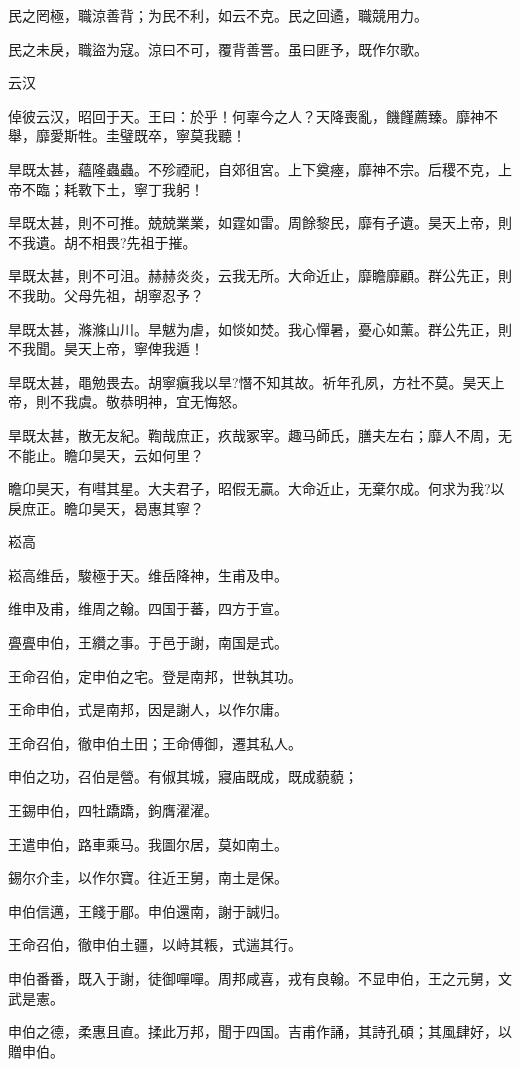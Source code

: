 民之罔極，職涼善背；为民不利，如云不克。民之回遹，職競用力。

民之未戾，職盜为寇。涼曰不可，覆背善詈。虽曰匪予，既作尔歌。

云汉

倬彼云汉，昭回于天。王曰：於乎！何辜今之人？天降喪亂，饑饉薦臻。靡神不舉，靡愛斯牲。圭璧既卒，寧莫我聽！

旱既太甚，蘊隆蟲蟲。不殄禋祀，自郊徂宮。上下奠瘞，靡神不宗。后稷不克，上帝不臨；耗斁下土，寧丁我躬！

旱既太甚，則不可推。兢兢業業，如霆如雷。周餘黎民，靡有孑遺。昊天上帝，則不我遺。胡不相畏?先祖于摧。

旱既太甚，則不可沮。赫赫炎炎，云我无所。大命近止，靡瞻靡顧。群公先正，則不我助。父母先祖，胡寧忍予？

旱既太甚，滌滌山川。旱魃为虐，如惔如焚。我心憚暑，憂心如薰。群公先正，則不我聞。昊天上帝，寧俾我遁！

旱既太甚，黽勉畏去。胡寧瘨我以旱?憯不知其故。祈年孔夙，方社不莫。昊天上帝，則不我虞。敬恭明神，宜无悔怒。

旱既太甚，散无友紀。鞫哉庶正，疚哉冢宰。趣马師氏，膳夫左右；靡人不周，无不能止。瞻卬昊天，云如何里？

瞻卬昊天，有嘒其星。大夫君子，昭假无贏。大命近止，无棄尔成。何求为我?以戾庶正。瞻卬昊天，曷惠其寧？

崧高

崧高维岳，駿極于天。维岳降神，生甫及申。

维申及甫，维周之翰。四国于蕃，四方于宣。

亹亹申伯，王纘之事。于邑于謝，南国是式。

王命召伯，定申伯之宅。登是南邦，世執其功。

王命申伯，式是南邦，因是謝人，以作尔庸。

王命召伯，徹申伯土田；王命傅御，遷其私人。

申伯之功，召伯是營。有俶其城，寢庙既成，既成藐藐；

王錫申伯，四牡蹻蹻，鉤膺濯濯。

王遣申伯，路車乘马。我圖尔居，莫如南土。

錫尔介圭，以作尔寶。往近王舅，南土是保。

申伯信邁，王餞于郿。申伯還南，謝于誠归。

王命召伯，徹申伯土疆，以峙其粻，式遄其行。

申伯番番，既入于謝，徒御嘽嘽。周邦咸喜，戎有良翰。不显申伯，王之元舅，文武是憲。

申伯之德，柔惠且直。揉此万邦，聞于四国。吉甫作誦，其詩孔碩；其風肆好，以贈申伯。

